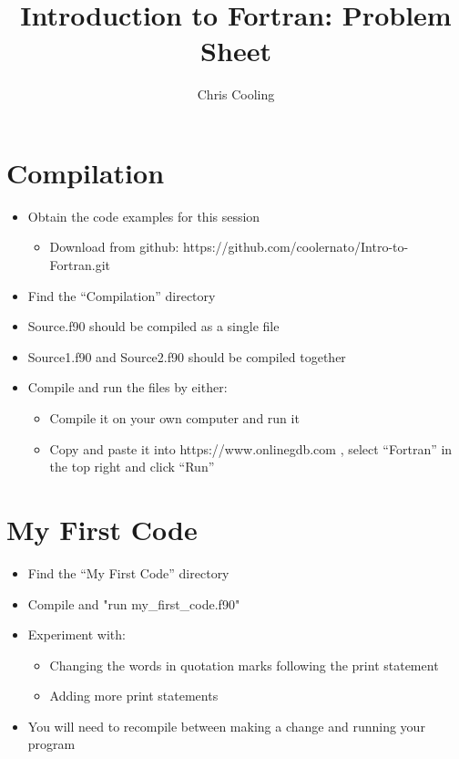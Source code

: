 \documentclass[11pt,a4paper]{article}
\begin{document}
\title{Introduction to Fortran: Problem Sheet}
\author{Chris Cooling}
\maketitle
\pagestyle{empty}
\thispagestyle{empty}

\section{Compilation}
\begin{itemize}
\item Obtain the code examples for this session
\begin{itemize}
\item Download from github: https://github.com/coolernato/Intro-to-Fortran.git
\end{itemize}
\item Find the “Compilation” directory
\item Source.f90 should be compiled as a single file
\item Source1.f90 and Source2.f90 should be compiled together
\item Compile and run the files by either:
\begin{itemize}
\item Compile it on your own computer and run it
\item Copy and paste it into https://www.onlinegdb.com , select “Fortran” in the top right and click “Run”
\end{itemize}
\end{itemize}

\section{My First Code}
\begin{itemize}
    \item Find the “My First Code” directory
    \item Compile and "run my\_first\_code.f90"
    \item Experiment with:
\begin{itemize}
    \item Changing the words in quotation marks following the print statement
    \item Adding more print statements
\end{itemize}
    \item You will need to recompile between making a change and running your program
\end{itemize}
\end{document}
